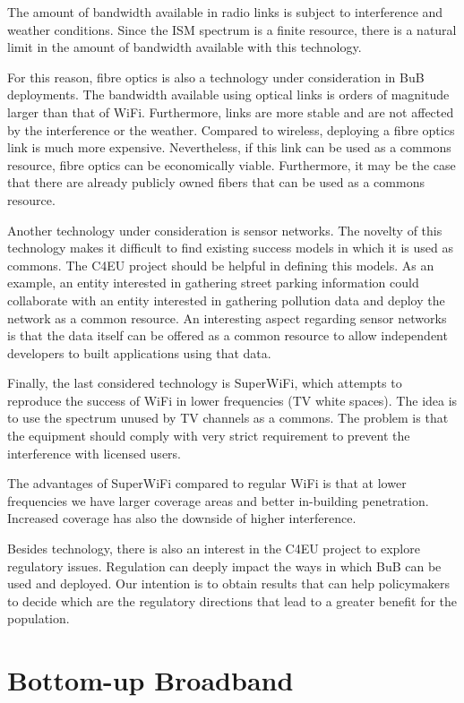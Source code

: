 \documentclass[conference]{IEEEtran}
\begin{document}
The amount of bandwidth available in radio links is subject to interference and weather conditions.
Since the ISM spectrum is a finite resource, there is a natural limit in the amount of bandwidth available with this technology.

For this reason, fibre optics is also a technology under consideration in BuB deployments.
The bandwidth available using optical links is orders of magnitude larger than that of WiFi.
Furthermore, links are more stable and are not affected by the interference or the weather.
Compared to wireless, deploying a fibre optics link is much more expensive.
Nevertheless, if this link can be used as a commons resource, fibre optics can be economically viable.
Furthermore, it may be the case that there are already publicly owned fibers that can be used as a commons resource.

Another technology under consideration is sensor networks.
The novelty of this technology makes it difficult to find existing success models in which it is used as commons.
The C4EU project should be helpful in defining this models.
As an example, an entity interested in gathering street parking information could collaborate with an entity interested in gathering pollution data and deploy the network as a common resource.
An interesting aspect regarding sensor networks is that the data itself can be offered as a common resource to allow independent developers to built applications using that data.

Finally, the last considered technology is SuperWiFi, which attempts to reproduce the success of WiFi in lower frequencies (TV white spaces).
The idea is to use the spectrum unused by TV channels as a commons.
The problem is that the equipment should comply with very strict requirement to prevent the interference with licensed users.

The advantages of SuperWiFi compared to regular WiFi is that at lower frequencies we have larger coverage areas and better in-building penetration.
Increased coverage has also the downside of higher interference.

Besides technology, there is also an interest in the C4EU project to explore regulatory issues.
Regulation can deeply impact the ways in which BuB can be used and deployed.
Our intention is to obtain results that can help policymakers to decide which are the regulatory directions that lead to a greater benefit for the population.

\section{Bottom-up Broadband}
\end{document}
